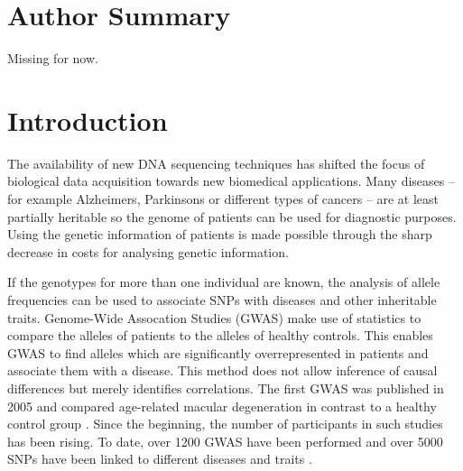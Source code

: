 \documentclass[10pt]{article}
\begin{document}
\section*{Author Summary}
Missing for now.

\section*{Introduction}

The availability of new DNA sequencing techniques has shifted the focus of biological data acquisition towards new biomedical applications.
Many diseases – for example Alzheimers, Parkinsons or different types of cancers – are at least partially heritable so the genome 
of patients can be used for diagnostic purposes. Using the genetic information of patients is made possible through the sharp decrease in costs for analysing genetic information. 



If the genotypes for more than one individual are known, the analysis of
allele frequencies can be used to associate SNPs with diseases and other inheritable traits. Genome-Wide Assocation Studies
(GWAS) make use of statistics to compare the alleles of patients to the alleles of healthy controls. This
enables GWAS to find alleles which are significantly overrepresented in patients and associate them with a disease.
This method does not allow inference of causal differences but merely identifies correlations. 
The first GWAS was published in 2005 and compared age-related macular degeneration in contrast 
to a healthy control group \cite{Klein2005}. Since the beginning, the number of participants in 
such studies has been rising. To date, over 1200 GWAS have been performed \cite{Johnson2009} and over 
5000 SNPs have been linked to different diseases and traits \cite{Hindorff2009}. 
\end{document}
